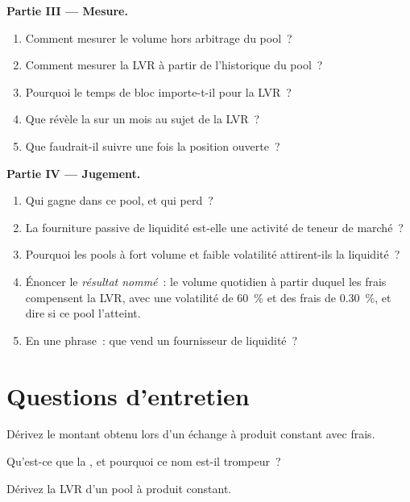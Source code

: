 \begin{problem}
\medskip\noindent\textbf{Partie III --- Mesure.}
\begin{enumerate}[resume]
\item Comment mesurer le volume hors arbitrage du pool~?
\item Comment mesurer la LVR à partir de l'historique du pool~?
\item Pourquoi le temps de bloc importe-t-il pour la LVR~?
\item Que révèle la  sur un mois au sujet de la LVR~?
\item Que faudrait-il suivre une fois la position ouverte~?
\end{enumerate}

\medskip\noindent\textbf{Partie IV --- Jugement.}
\begin{enumerate}[resume]
\item Qui gagne dans ce pool, et qui perd~?
\item La fourniture passive de liquidité est-elle une activité de teneur de marché~?
\item Pourquoi les pools à fort volume et faible volatilité attirent-ils la liquidité~?
\item Énoncer le \emph{résultat nommé}~: le volume quotidien à partir duquel les frais compensent la LVR, avec une volatilité de 60~\% et des frais de 0.30~\%, et dire si ce pool l'atteint.
\item En une phrase~: que vend un fournisseur de liquidité~?
\end{enumerate}
\end{problem}

\section{Questions d'entretien}

\begin{interviewq}\label{iq:m3:automated-market-makers:1}
Dérivez le montant obtenu lors d'un échange à produit constant avec frais.
\end{interviewq}

\begin{interviewq}\label{iq:m3:automated-market-makers:2}
Qu'est-ce que la , et pourquoi ce nom est-il trompeur~?
\end{interviewq}

\begin{interviewq}\label{iq:m3:automated-market-makers:3}
Dérivez la LVR d'un pool à produit constant.
\end{interviewq}

